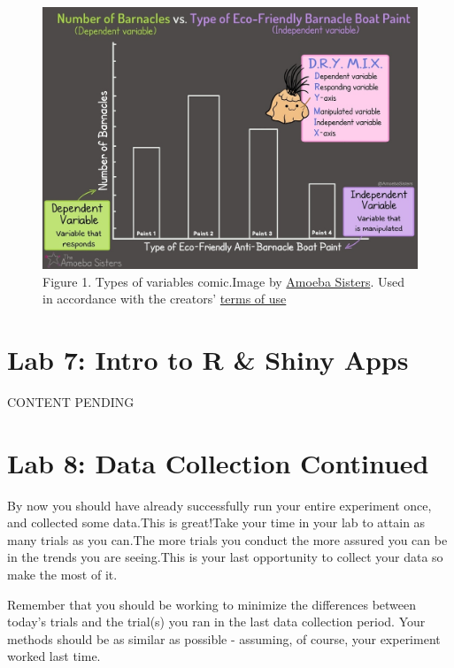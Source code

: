 \documentclass[
]{book}
\begin{document}
\begin{figure}
\centering
\includegraphics{figures_images/Lab6-Fig1.jpg}
\caption{Figure 1. Types of variables comic.Image by \href{https://www.amoebasisters.com/parameciumparlorcomics/category/nature-of-science/2}{Amoeba Sisters}. Used in accordance with the creators' \href{https://www.amoebasisters.com/termsofuse.html}{terms of use}}
\end{figure}

\hypertarget{lab-7-intro-to-r-shiny-apps}{%
\chapter*{Lab 7: Intro to R \& Shiny Apps}\label{lab-7-intro-to-r-shiny-apps}}

CONTENT PENDING

\hypertarget{lab-8-data-collection-continued}{%
\chapter*{Lab 8: Data Collection Continued}\label{lab-8-data-collection-continued}}

By now you should have already successfully run your entire experiment once, and collected some data.This is great!Take your time in your lab to attain as many trials as you can.The more trials you conduct the more assured you can be in the trends you are seeing.This is your last opportunity to collect your data so make the most of it.

Remember that you should be working to minimize the differences between today's trials and the trial(s) you ran in the last data collection period. Your methods should be as similar as possible - assuming, of course, your experiment worked last time.
\end{document}
